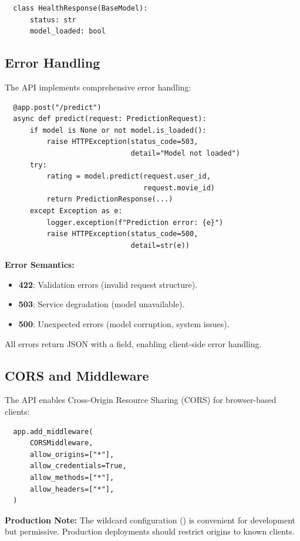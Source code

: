 \begin{verbatim}
  class HealthResponse(BaseModel):
      status: str
      model_loaded: bool
\end{verbatim}

\subsection{Error Handling}

The API implements comprehensive error handling:

\begin{verbatim}
  @app.post("/predict")
  async def predict(request: PredictionRequest):
      if model is None or not model.is_loaded():
          raise HTTPException(status_code=503, 
                              detail="Model not loaded")
      try:
          rating = model.predict(request.user_id, 
                                 request.movie_id)
          return PredictionResponse(...)
      except Exception as e:
          logger.exception(f"Prediction error: {e}")
          raise HTTPException(status_code=500, 
                              detail=str(e))
\end{verbatim}

\textbf{Error Semantics:}
\begin{itemize}
  \item \textbf{422}: Validation errors (invalid request structure).
  \item \textbf{503}: Service degradation (model unavailable).
  \item \textbf{500}: Unexpected errors (model corruption, system issues).
\end{itemize}

All errors return JSON with a  field, enabling client-side error handling.

\subsection{CORS and Middleware}

The API enables Cross-Origin Resource Sharing (CORS) for browser-based clients:

\begin{verbatim}
  app.add_middleware(
      CORSMiddleware,
      allow_origins=["*"],
      allow_credentials=True,
      allow_methods=["*"],
      allow_headers=["*"],
  )
\end{verbatim}

\textbf{Production Note:} The wildcard configuration () is convenient for 
development but permissive. Production deployments should restrict origins to known clients.

